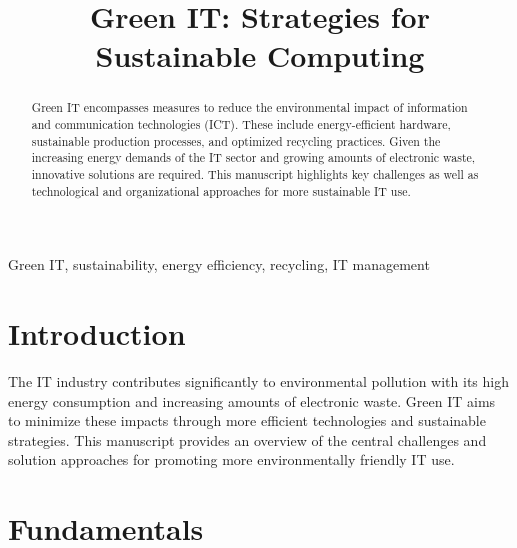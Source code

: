 \documentclass[10pt,twocolumn,conference]{IEEEtran}
\begin{document}
\title{Green IT: Strategies for Sustainable Computing}

\author{
}

\maketitle

\begin{abstract}
Green IT encompasses measures to reduce the environmental impact of information and communication technologies (ICT). These include energy-efficient hardware, sustainable production processes, and optimized recycling practices. Given the increasing energy demands of the IT sector and growing amounts of electronic waste, innovative solutions are required. This manuscript highlights key challenges as well as technological and organizational approaches for more sustainable IT use.
\end{abstract}

\begin{IEEEkeywords}
Green IT, sustainability, energy efficiency, recycling, IT management
\end{IEEEkeywords}

\section{Introduction}
The IT industry contributes significantly to environmental pollution with its high energy consumption and increasing amounts of electronic waste. Green IT aims to minimize these impacts through more efficient technologies and sustainable strategies. This manuscript provides an overview of the central challenges and solution approaches for promoting more environmentally friendly IT use.

\section{Fundamentals}
\end{document}
